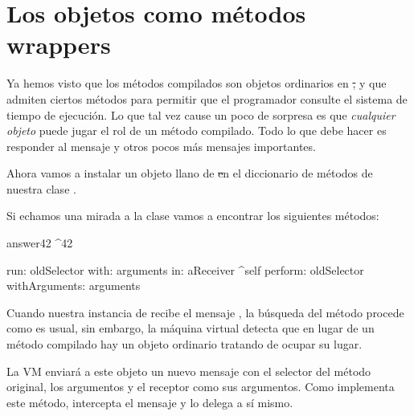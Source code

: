 \documentclass[a4paper,10pt,twoside]{book}
\begin{document}
\section{Los objetos como métodos wrappers}

Ya hemos visto que los métodos compilados son objetos ordinarios en
\st, y que admiten ciertos métodos para permitir que el programador
consulte el sistema de tiempo de ejecución.  Lo que tal vez cause un
poco de sorpresa es que \emph{cualquier objeto}  puede jugar el rol de
un método compilado.  Todo lo que debe hacer es responder al mensaje
 y otros pocos más mensajes importantes.



Ahora vamos a instalar un objeto llano de \st en el diccionario de
métodos de nuestra clase .



Si echamos una mirada a la clase 
vamos a encontrar los siguientes métodos:

\begin{code}{}
answer42
        ^42

run: oldSelector with: arguments in: aReceiver
        ^self perform: oldSelector withArguments: arguments
\end{code}

Cuando nuestra instancia de  recibe el mensaje ,
la búsqueda del método procede como es usual, sin embargo, la máquina
virtual detecta que en lugar de un método compilado hay un objeto
ordinario tratando de ocupar su lugar.

La VM enviará a este objeto un nuevo mensaje  con el
selector del método original, los argumentos y el receptor como sus
argumentos.
Como   implementa este método, intercepta
el mensaje y lo delega a sí mismo.
\end{document}
